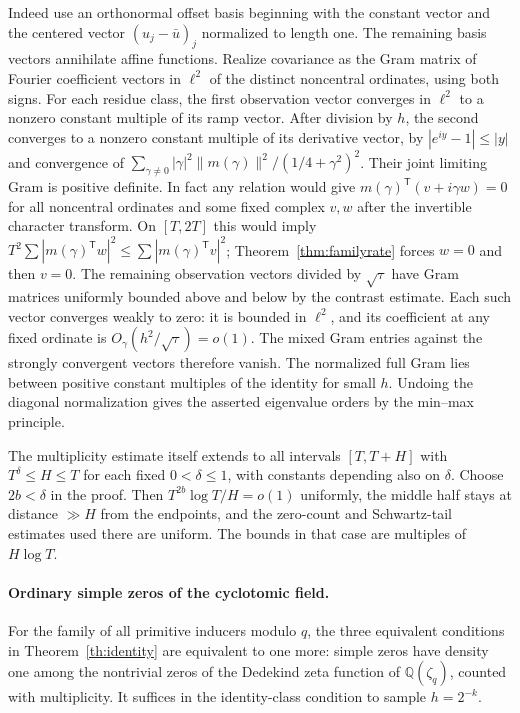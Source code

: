 \documentclass[11pt]{article}
\begin{document}
Indeed use an orthonormal offset basis beginning with the constant vector
and the centered vector $(u_j-\bar u)_j$ normalized to length one.
The remaining basis vectors annihilate affine functions.
Realize covariance as the Gram matrix of Fourier coefficient vectors in
$\ell^2$ of the distinct noncentral ordinates, using both signs.
For each residue class, the first observation vector converges in $\ell^2$
to a nonzero constant multiple of its ramp vector. After division by $h$,
the second converges to a nonzero constant multiple of its derivative
vector, by $|e^{iy}-1|\le |y|$ and convergence of
$\sum_{\gamma\ne0}|\gamma|^2\|m(\gamma)\|^2/(1/4+\gamma^2)^2$.
Their joint limiting Gram is positive definite. In fact any relation would
give $m(\gamma)^{\mathsf T}(v+i\gamma w)=0$ for all noncentral ordinates
and some fixed complex $v,w$ after the invertible character transform.
On $[T,2T]$ this would imply
$T^2\sum|m(\gamma)^{\mathsf T}w|^2\le\sum|m(\gamma)^{\mathsf T}v|^2$;
Theorem~\ref{thm:familyrate} forces $w=0$ and then $v=0$.
The remaining observation vectors divided by $\sqrt\tau$ have Gram matrices
uniformly bounded above and below by the contrast estimate. Each such
vector converges weakly to zero: it is bounded in $\ell^2$, and its
coefficient at any fixed ordinate is $O_\gamma(h^2/\sqrt\tau)=o(1)$.
The mixed Gram entries against the strongly convergent vectors therefore
vanish. The normalized full Gram lies between positive constant multiples
of the identity for small $h$. Undoing the diagonal normalization gives
the asserted eigenvalue orders by the min--max principle.

The multiplicity estimate itself extends to all intervals $[T,T+H]$ with
$T^\delta\le H\le T$ for each fixed $0<\delta\le1$, with constants
depending also on $\delta$. Choose $2b<\delta$ in the proof.
Then $T^{2b}\log T/H=o(1)$ uniformly, the middle half stays at distance
$\gg H$ from the endpoints, and the zero-count and Schwartz-tail estimates
used there are uniform. The bounds in that case are multiples of $H\log T$.

\paragraph{Ordinary simple zeros of the cyclotomic field.}
For the family of all primitive inducers modulo $q$, the three equivalent
conditions in Theorem~\ref{th:identity} are equivalent to one more:
simple zeros have density one among the nontrivial zeros of the Dedekind
zeta function of $\mathbb Q(\zeta_q)$, counted with multiplicity. It suffices
in the identity-class condition to sample $h=2^{-k}$.
\end{document}
